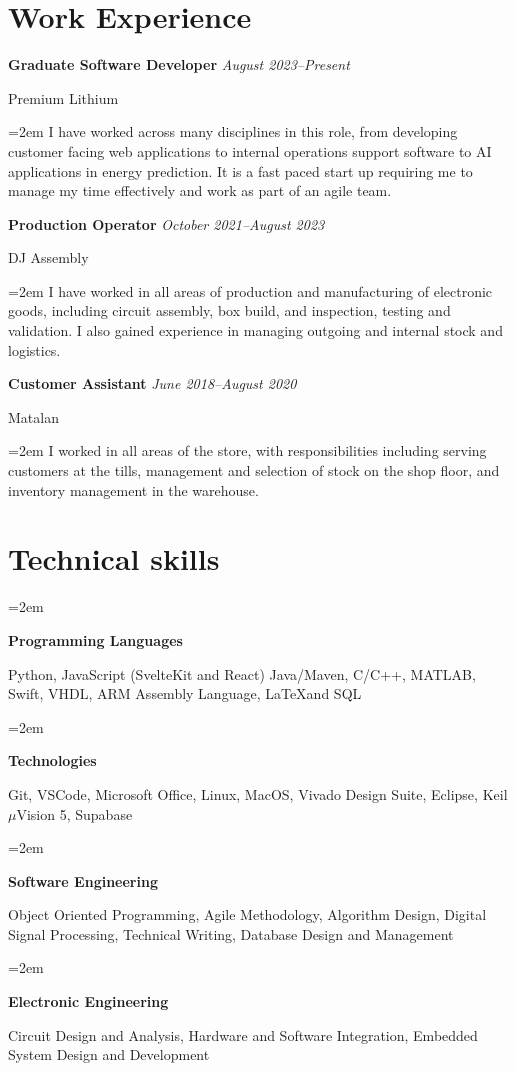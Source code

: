 \documentclass[12pt]{article} %
\newlength{\spacebox}
\newcommand{\skill}[2]{
  \noindent\hangindent=2em\hangafter=0
  \parbox{3\spacebox}{%
  \textbf{#1}} %
  #2 \par} %
\newcommand{\work}[4]{
  \noindent  \textbf{#1}
  \newline
  \noindent \textit{#2} \par
  \noindent #3 \par
\vspace*{0.5em}
  \noindent\hangindent=2em\hangafter=0 \small #4 
\normalsize \par}
\begin{document}
\section*{Work Experience}
\work{Graduate Software Developer}{August 2023--Present}{Premium Lithium}{I have worked across many disciplines in this role, from developing customer facing web applications to internal operations support software to AI applications in energy prediction. It is a fast paced start up requiring me to manage my time effectively and work as part of an agile team.}
\newpage
\work{Production Operator}{October 2021--August 2023}{DJ Assembly}{I have worked in all areas of production and manufacturing of electronic goods, including circuit assembly, box build, and inspection, testing and validation. I also gained experience in managing outgoing and internal stock and logistics.}
\work{Customer Assistant}{June 2018--August 2020}{Matalan}{I worked in all areas of the store, with responsibilities including serving customers at the tills, management and selection of stock on the shop floor, and inventory management in the warehouse.}

\section*{Technical skills}

\skill{Programming Languages}{Python, JavaScript (SvelteKit and React) Java/Maven, C/C++, MATLAB, Swift, VHDL, ARM Assembly Language, \LaTeX and SQL}
\skill{Technologies}{Git, VSCode, Microsoft Office, Linux, MacOS, Vivado Design Suite, Eclipse, Keil $\mu$Vision 5, Supabase}
\skill{Software Engineering}{Object Oriented Programming, Agile Methodology, Algorithm Design, Digital Signal Processing, Technical Writing, Database Design and Management}
\skill{Electronic Engineering}{Circuit Design and Analysis, Hardware and Software Integration, Embedded System Design and Development}
\end{document}
